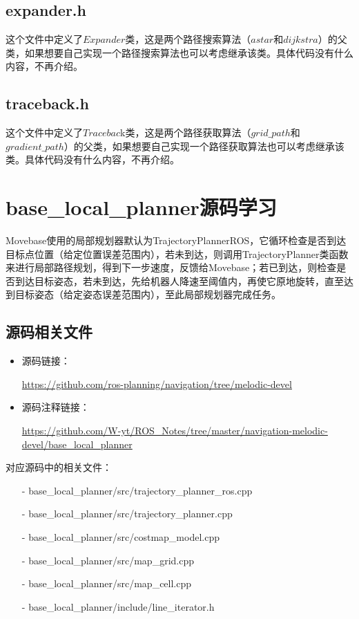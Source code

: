 \documentclass[9pt, oneside]{book}
\begin{document}
\subsection{expander.h}

这个文件中定义了$Expander$类，这是两个路径搜索算法（$astar$和$dijkstra$）的父类，如果想要自己实现一个路径搜索算法也可以考虑继承该类。具体代码没有什么内容，不再介绍。

\subsection{traceback.h}

这个文件中定义了$Tracebac$k类，这是两个路径获取算法（$grid\_path$和$gradient\_path$）的父类，如果想要自己实现一个路径获取算法也可以考虑继承该类。具体代码没有什么内容，不再介绍。


\section{base\_local\_planner源码学习}

Movebase使用的局部规划器默认为TrajectoryPlannerROS，它循环检查是否到达目标点位置（给定位置误差范围内），若未到达，则调用TrajectoryPlanner类函数来进行局部路径规划，得到下一步速度，反馈给Movebase；若已到达，则检查是否到达目标姿态，若未到达，先给机器人降速至阈值内，再使它原地旋转，直至达到目标姿态（给定姿态误差范围内），至此局部规划器完成任务。


\subsection{源码相关文件}

\begin{itemize}
    \item 源码链接：
    
    \url{https://github.com/ros-planning/navigation/tree/melodic-devel}

    \item 源码注释链接：
    
    \small
    \url{https://github.com/W-yt/ROS_Notes/tree/master/navigation-melodic-devel/base_local_planner}
    \normalsize
\end{itemize}

对应源码中的相关文件：

\begin{itemize}
    \item [-] base\_local\_planner/src/trajectory\_planner\_ros.cpp
    \item [-] base\_local\_planner/src/trajectory\_planner.cpp
    \item [-] base\_local\_planner/src/costmap\_model.cpp
    \item [-] base\_local\_planner/src/map\_grid.cpp
    \item [-] base\_local\_planner/src/map\_cell.cpp
    \item [-] base\_local\_planner/include/line\_iterator.h
\end{itemize}
\end{document}
